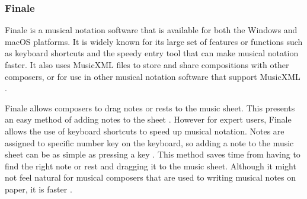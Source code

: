     	\subsubsection{Finale}
        
        Finale is a musical notation software that is available for both the Windows and macOS platforms. It is widely known for its large set of features or functions such as keyboard shortcuts \citep{knoder2017finale} and the speedy entry tool that can make musical notation faster. It also uses MusicXML files to store and share compositions with other composers, or for use in other musical notation software that support MusicXML \citep{otter2017finale}.
                
        
        Finale allows composers to drag notes or rests to the music sheet. This presents an easy method of adding notes to the sheet \citep{otter2017finale}. However for expert users, Finale allows the use of keyboard shortcuts to speed up musical notation. Notes are assigned to specific number key on the keyboard, so adding a note to the music sheet can be as simple as pressing a key \citep{knoder2017finale}. This method saves time from having to find the right note or rest and dragging it to the music sheet. Although it might not feel natural for musical composers that are used to writing musical notes on paper, it is faster \citep{knoder2017finale}. 
        
        

